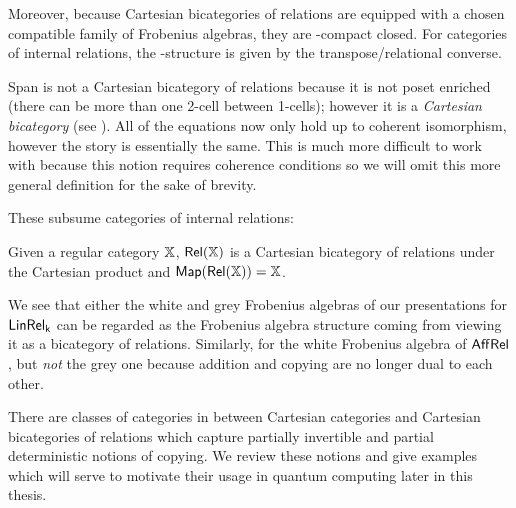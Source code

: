 Moreover, because Cartesian bicategories of relations are equipped with a chosen compatible family of Frobenius algebras, they are \dag-compact closed. For categories of internal relations, the \dag-structure is given by the transpose/relational converse.

Span is not a Cartesian bicategory of relations because it is not poset enriched (there can be more than one 2-cell between 1-cells); however it is a {\em Cartesian bicategory} (see \cite{carbonia}).  All of the equations now only hold up to coherent isomorphism, however the story is essentially the same. This is much more difficult to work with because this notion requires coherence conditions so we will omit this more general definition for the sake of brevity. 


These subsume categories of internal relations:
\begin{example}
Given a regular category $\mathbb{X}$, $\mathsf{Rel}(\mathbb{X})$ is a Cartesian bicategory of relations under the Cartesian product and ${\sf Map}(\mathsf{Rel}(\mathbb{X}))=\mathbb{X}$.
\end{example}
We see that either the white and grey Frobenius algebras of our presentations for $\sf LinRel_k$ can be regarded as the Frobenius algebra structure coming from viewing it as a bicategory of relations.  Similarly, for the white Frobenius algebra of  $\mathsf{Aff}\mathsf{Rel}$, but {\em not} the grey one because addition and copying are no longer dual to each other.




There are classes of categories in between Cartesian categories and Cartesian bicategories of relations which capture partially invertible and partial deterministic notions of copying.  We review these notions and give examples which will serve to motivate their usage in quantum computing later in this thesis.





